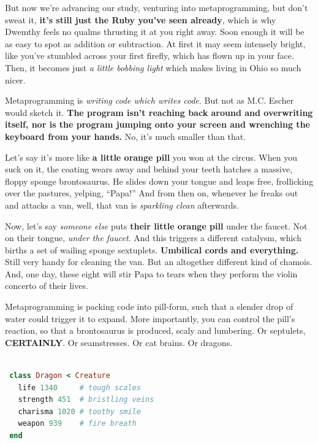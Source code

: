\documentclass[10pt,twoside]{report}
\begin{document}
But now we're advancing our study, venturing into metaprogramming, but
don't sweat it, {\bf it's still just the Ruby you've seen already},
which is why Dwemthy feels no qualms thrusting it at you right away.
Soon enough it will be as easy to spot as addition or subtraction.  At
first it may seem intensely bright, like you've stumbled across your
first firefly, which has flown up in your face.  Then, it becomes just
{\em a little bobbing light} which makes living in Ohio so much nicer.

Metaprogramming is {\em writing code which writes code}.  But not as
M.C. Escher would sketch it.  {\bf The program isn't reaching back
  around and overwriting itself, nor is the program jumping onto your
  screen and wrenching the keyboard from your hands.}  No, it's much
smaller than that.

Let's say it's more like {\bf a little orange pill} you won at the
circus.  When you suck on it, the coating wears away and behind your
teeth hatches a massive, floppy sponge brontosaurus.  He slides down
your tongue and leaps free, frollicking over the pastures, yelping,
``Papa!''  And from then on, whenever he freaks out and attacks a van,
well, that van is {\em sparkling clean} afterwards.

Now, let's say {\em someone else} puts {\bf their little orange pill}
under the faucet.  Not on their tongue, {\em under the faucet}.  And
this triggers a different catalysm, which births a set of wailing
sponge sextuplets.  {\bf Umbilical cords and everything.}  Still very
handy for cleaning the van. But an altogether different kind of
chamois.  And, one day, these eight will stir Papa to tears when they
perform the violin concerto of their lives.

Metaprogramming is packing code into pill-form, such that a slender
drop of water could trigger it to expand. More importantly, you can
control the pill's reaction, so that a brontosaurus is produced, scaly
and lumbering. Or septulets, {\bf CERTAINLY}.  Or seamstresses.  Or
cat brains.  Or dragons.

\begin{lstlisting}[basicstyle=\ttfamily\color{basiccolor},
    commentstyle = \ttfamily\color{commentcolor},
    keywordstyle=\ttfamily\color{keywordscolor},
    stringstyle=\color{stringcolor},
    language=Ruby,
    basicstyle=\small\ttfamily,
    showstringspaces=false,
  ]

 class Dragon < Creature
   life 1340     # tough scales
   strength 451  # bristling veins
   charisma 1020 # toothy smile
   weapon 939    # fire breath
 end

\end{lstlisting}
\end{document}

